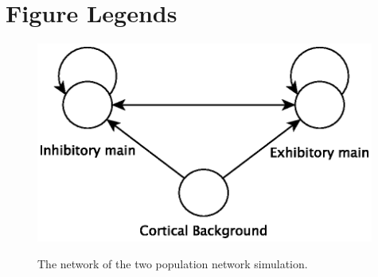 \documentclass[12pt]{article}
\begin{document}



\section*{Figure Legends}
\begin{figure}[tbp]
	\includegraphics[width=0.99\textwidth]{twoPopNetwork.eps}
    \label{fig:twoPopNetwork}
    \caption{The network of the two population network simulation.}
\end{figure}
\end{document}
